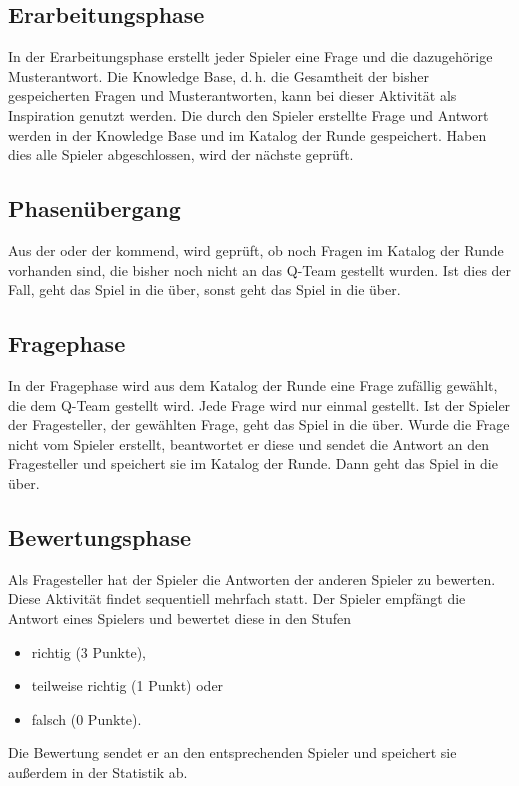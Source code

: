 \documentclass[a4paper,11pt,listof=numbered,glossary=totoc,parskip=half,toc=bib]{scrreprt}
\newcommand{\dash}{\mbox{d.\,h.}\xspace}
\begin{document}
	\subsection{Erarbeitungsphase}
	\label{subsec:erarbeitungsphase}
	In der Erarbeitungsphase erstellt jeder Spieler eine Frage und die dazugehörige Musterantwort. Die Knowledge Base, \dash die Gesamtheit der bisher gespeicherten Fragen und Musterantworten, kann bei dieser Aktivität als Inspiration genutzt werden. Die durch den Spieler erstellte Frage und Antwort werden in der Knowledge Base und im Katalog der Runde gespeichert. Haben dies alle Spieler abgeschlossen, wird der nächste  geprüft.
	
	\subsection{Phasenübergang}
	\label{subsec:phasenuebergang}
	Aus der  oder der  kommend, wird geprüft, ob noch Fragen im Katalog der Runde vorhanden sind, die bisher noch nicht an das Q-Team gestellt wurden. Ist dies der Fall, geht das Spiel in die  über, sonst geht das Spiel in die  über.
	
	\subsection{Fragephase}
	\label{subsec:fragephase}
	In der Fragephase wird aus dem Katalog der Runde eine Frage zufällig gewählt, die dem Q-Team gestellt wird. Jede Frage wird nur einmal gestellt. Ist der Spieler der Fragesteller, der gewählten Frage, geht das Spiel in die  über. Wurde die Frage nicht vom Spieler erstellt, beantwortet er diese und sendet die Antwort an den Fragesteller und speichert sie im Katalog der Runde. Dann geht das Spiel in die  über.
	
	\subsection{Bewertungsphase}
	\label{subsec:bewertungsphase}
	Als Fragesteller hat der Spieler die Antworten der anderen Spieler zu bewerten. Diese Aktivität findet sequentiell mehrfach statt. Der Spieler empfängt die Antwort eines Spielers und bewertet diese in den Stufen
	\begin{itemize}
	\item richtig (3 Punkte),
	\item teilweise richtig (1 Punkt) oder
	\item falsch (0 Punkte).
	\end{itemize}
	Die Bewertung sendet er an den entsprechenden Spieler und speichert sie außerdem in der Statistik ab.
	
\end{document}
